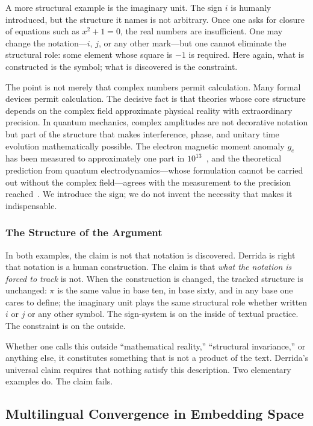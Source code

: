 \documentclass[a4paper,twocolumn,11pt]{article}
\begin{document}
A more structural example is the imaginary unit. The sign $i$ is humanly introduced, but the structure it names is not arbitrary. Once one asks for closure of equations such as $x^2 + 1 = 0$, the real numbers are insufficient. One may change the notation---$i$, $j$, or any other mark---but one cannot eliminate the structural role: some element whose square is $-1$ is required. Here again, what is constructed is the symbol; what is discovered is the constraint.

The point is not merely that complex numbers permit calculation. Many formal devices permit calculation. The decisive fact is that theories whose core structure depends on the complex field approximate physical reality with extraordinary precision. In quantum mechanics, complex amplitudes are not decorative notation but part of the structure that makes interference, phase, and unitary time evolution mathematically possible. The electron magnetic moment anomaly $g_e$ has been measured to approximately one part in $10^{13}$~\cite{FanGabrielse2023}, and the theoretical prediction from quantum electrodynamics---whose formulation cannot be carried out without the complex field---agrees with the measurement to the precision reached~\cite{AoyamaKinoshita2019}. We introduce the sign; we do not invent the necessity that makes it indispensable.

\subsubsection*{The Structure of the Argument}

In both examples, the claim is not that notation is discovered. Derrida is right that notation is a human construction. The claim is that \emph{what the notation is forced to track} is not. When the construction is changed, the tracked structure is unchanged: $\pi$ is the same value in base ten, in base sixty, and in any base one cares to define; the imaginary unit plays the same structural role whether written $i$ or $j$ or any other symbol. The sign-system is on the inside of textual practice. The constraint is on the outside.

Whether one calls this outside ``mathematical reality,'' ``structural invariance,'' or anything else, it constitutes something that is not a product of the text. Derrida's universal claim requires that nothing satisfy this description. Two elementary examples do. The claim fails.

\subsection{Multilingual Convergence in Embedding Space}
\label{sec:multilingual}
\end{document}
